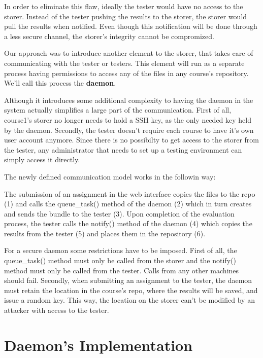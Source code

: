 In order to eliminate this flaw, ideally the tester would have no access to the
storer. Instead of the tester pushing the results to the storer, the storer
would pull the results when notified. Even though this notification will be done
through a less secure channel, the storer's integrity cannot be compromized.

Our approach was to introduce another element to the storer, that takes care
of communicating with the tester or testers. This element will run as a separate
process having permissions to access any of the files in any course's repository.
We'll call this process the \textbf{daemon}.

Although it introduces some additional complexity to 
having the daemon in the system actually simplifies a large part of the communication.
First of all, course1's storer no longer needs to hold a SSH key, as the only needed
key held by the daemon. Secondly, the tester doesn't require each course to have
it's own user account anymore. Since there is no possibilty to get access to the 
storer from the tester, any administrator that needs to set up a testing environment
can simply access it directly.

The newly defined communication model works in the followin way:

The submission of an assignment in the web interface copies the files to the
repo (1) and calls the queue_task() method of the daemon (2) which in turn
creates and sends the bundle to the tester (3).
Upon completion of the evaluation process, the tester calls the notify() 
method of the daemon (4) which copies the results from the tester (5)
and places them in the repository (6).

For a secure daemon some restrictions have to be imposed. First of all, the 
queue_task() method must only be called from the storer and the
notify() method must only be called from the tester. Calls from any other
machines should fail. Secondly, when submitting an assignment to the tester,
the daemon must retain the location in the course's repo, where the results will
be saved, and issue a random key. This way, the location on the storer can't be
modified by an attacker with access to the tester.

\begin{center}
\end{center}


\section{Daemon's Implementation}
\label{sec:vmc-daemon}

